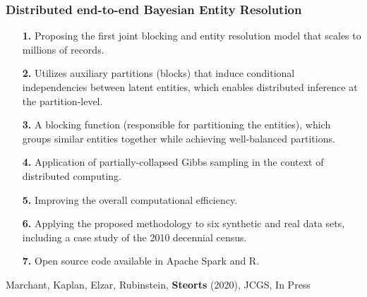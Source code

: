 \documentclass[9pt]{beamer}
\begin{document}
\begin{frame}
\frametitle{Distributed end-to-end Bayesian Entity Resolution}

\begin{enumerate}
\item[{\color{orange} \bf 1.}] Proposing the first joint blocking and entity resolution model that scales to millions of records. \vfill
\item[{\color{orange} \bf 2.}] Utilizes auxiliary partitions (blocks) that induce conditional independencies between latent entities, which enables  distributed inference at the partition-level. \vfill
\item[{\color{orange} \bf 3.}] A blocking function (responsible for partitioning the entities), which groups similar entities together while achieving well-balanced partitions. \vfill
\item[{\color{orange} \bf 4.}] Application of partially-collapsed Gibbs sampling in the context of distributed computing. \vfill
\item[{\color{orange} \bf 5.}] Improving the overall computational efficiency. \vfill
\item[{\color{orange} \bf 6.}] Applying the proposed methodology to six synthetic and real data sets, including a case study of the 2010 decennial census. \vfill
\item[{\color{orange} \bf 7.}] Open source code available in Apache Spark and R. \vfill
\end{enumerate}


 \vspace*{1em} 
   
   Marchant, Kaplan, Elzar, Rubinstein, \textbf{Steorts} (2020), JCGS, In Press
 
\end{frame}
\end{document}
